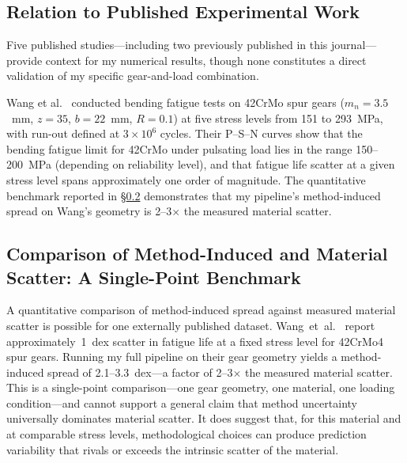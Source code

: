 \documentclass[12pt,a4paper]{article}
\begin{document}
\subsection{Relation to Published Experimental Work}

Five published studies---including two previously published in
this journal---provide context for my numerical results, though
none constitutes a direct validation of my specific
gear-and-load combination.

Wang et al.~\cite{wang2023} conducted bending fatigue tests on 42CrMo
spur gears ($m_n{=}3.5$~mm, $z{=}35$, $b{=}22$~mm, $R{=}0.1$) at five
stress levels from 151 to 293~MPa, with run-out defined at $3\times10^6$
cycles. Their P--S--N curves show that the bending fatigue limit for
42CrMo under pulsating load lies in the range 150--200~MPa (depending on
reliability level), and that fatigue life scatter at a given stress level
spans approximately one order of magnitude. The quantitative
benchmark reported in \S\ref{sec:method_dominates} demonstrates that
my pipeline's method-induced spread on Wang's geometry is
2--3$\times$ the measured material scatter.

\subsection{Comparison of Method-Induced and Material Scatter: A Single-Point Benchmark}
\label{sec:method_dominates}

A quantitative comparison of method-induced spread against measured
material scatter is possible for one externally published dataset.
Wang~et~al.~\cite{wang2023} report approximately~1~dex scatter in
fatigue life at a fixed stress level for 42CrMo4 spur gears. Running
my full pipeline on their gear geometry yields a method-induced spread
of 2.1--3.3~dex---a factor of 2--3$\times$ the measured material
scatter. This is a single-point comparison---one gear geometry, one material,
one loading condition---and cannot support a general claim that method
uncertainty universally dominates material scatter. It does suggest
that, for this material and at
comparable stress levels, methodological choices can produce prediction
variability that rivals or exceeds the intrinsic scatter of the
material.
\end{document}
